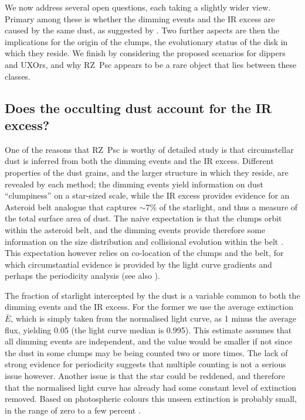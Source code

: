 \documentclass[]{rsos}
\begin{document}
We now address several open questions, each taking a slightly wider view. Primary among
these is whether the dimming events and the IR excess are caused by the same dust, as
suggested by \cite{2013A&A...553L...1D}. Two further aspects are then the implications
for the origin of the clumps, the evolutionary status of the disk in which they
reside. We finish by considering the proposed scenarios for dippers and UXOrs, and why
RZ~Psc appears to be a rare object that lies between these classes.

\subsection{Does the occulting dust account for the IR excess?}\label{ss:ir}

One of the reasons that RZ~Psc is worthy of detailed study is that circumstellar dust is
inferred from both the dimming events and the IR excess. Different properties of the dust
grains, and the larger structure in which they reside, are revealed by each method; the
dimming events yield information on dust ``clumpiness'' on a star-sized scale, while the
IR excess provides evidence for an Asteroid belt analogue that captures $\sim$7\% of the
starlight, and thus a measure of the total surface area of dust. The naive expectation is
that the clumps orbit within the asteroid belt, and the dimming events provide therefore
some information on the size distribution and collisional evolution within the belt
\cite{2013A&A...553L...1D}. This expectation however relies on co-location of the clumps
and the belt, for which circumstantial evidence is provided by the light curve gradients
and perhaps the periodicity analysis (see also \cite{2010A&A...524A...8G}).

The fraction of starlight intercepted by the dust is a variable common to both the
dimming events and the IR excess. For the former we use the average extinction $\bar{E}$,
which is simply taken from the normalised light curve, as 1 minus the average flux,
yielding 0.05 (the light curve median is 0.995). This estimate assumes that all dimming
events are independent, and the value would be smaller if not since the dust in some
clumps may be being counted two or more times. The lack of strong evidence for
periodicity suggests that multiple counting is not a serious issue however. Another issue
is that the star could be reddened, and therefore that the normalised light curve has
already had some constant level of extinction removed. Based on photospheric colours this
unseen extinction is probably small, in the range of zero to a few percent
\cite{2000ARep...44..611K}.
\end{document}

